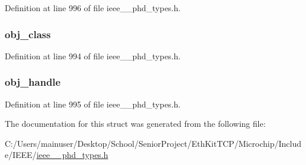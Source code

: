 Definition at line 996 of file ieee\+\_\+\_\+phd\+\_\+types.\+h.

\hypertarget{struct___config_object_a159d7983c34c4db7f58243490ff847c1}{}
\subsubsection[{obj\+\_\+class}]{ obj\+\_\+class}\label{struct___config_object_a159d7983c34c4db7f58243490ff847c1}


Definition at line 994 of file ieee\+\_\+\_\+phd\+\_\+types.\+h.

\hypertarget{struct___config_object_abbfff52b7a4956021522f5750c4b32c6}{}
\subsubsection[{obj\+\_\+handle}]{ obj\+\_\+handle}\label{struct___config_object_abbfff52b7a4956021522f5750c4b32c6}


Definition at line 995 of file ieee\+\_\+\_\+phd\+\_\+types.\+h.



The documentation for this struct was generated from the following file\+:\begin{DoxyCompactItemize}
\item 
C\+:/\+Users/mainuser/\+Desktop/\+School/\+Senior\+Project/\+Eth\+Kit\+T\+C\+P/\+Microchip/\+Include/\+I\+E\+E\+E/\hyperlink{ieee__11073__phd__types_8h}{ieee\+\_\+\_\+phd\+\_\+types.\+h}\end{DoxyCompactItemize}
